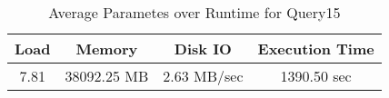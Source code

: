 \documentclass[../../main.tex]{subfiles}
\begin{document}
\begin{minipage}{.5\textwidth}
    \end{minipage}
    \begin{table}
        \begin{center}
            \begin{tabular}{ |c|c|c|c| } 
            \hline
            Load & Memory & Disk IO & Execution Time\\
            \hline
            7.81 & 38092.25 MB & 2.63 MB/sec & 1390.50 sec \\
            \hline
            \end{tabular}
            \\[1pt]
            \caption{Average Parametes over Runtime for Query15}
        \end{center}
    \end{table}
    \pagebreak
\end{document}

